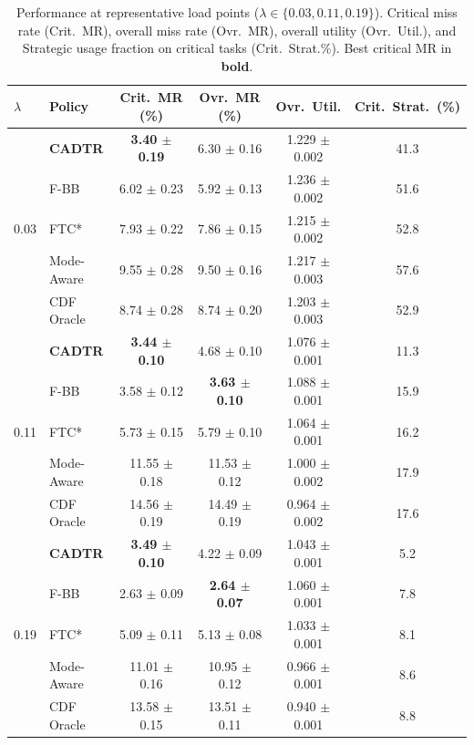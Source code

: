 \documentclass[fleqn,12pt,lineno]{wlpeerj}
\begin{document}
\begin{table}[t]
\centering
\caption{Performance at representative load points ($\lambda \in \{0.03, 0.11, 0.19\}$). Critical miss rate (Crit.\ MR), overall miss rate (Ovr.\ MR), overall utility (Ovr.\ Util.), and Strategic usage fraction on critical tasks (Crit.\ Strat.\%). Best critical MR in \textbf{bold}.}
\label{tab:lambda_sweep}
\begin{tabular}{l l c c c c}
\toprule
$\lambda$ & Policy & Crit.\ MR (\%) & Ovr.\ MR (\%) & Ovr.\ Util. & Crit.\ Strat.\ (\%) \\
\midrule
\multirow{5}{*}{0.03}
& \textbf{CADTR} & \textbf{3.40 $\pm$ 0.19} & 6.30 $\pm$ 0.16 & 1.229 $\pm$ 0.002 & 41.3 \\
& F-BB            & 6.02 $\pm$ 0.23          & 5.92 $\pm$ 0.13          & 1.236 $\pm$ 0.002          & 51.6 \\
& FTC*            & 7.93 $\pm$ 0.22          & 7.86 $\pm$ 0.15          & 1.215 $\pm$ 0.002          & 52.8 \\
& Mode-Aware      & 9.55 $\pm$ 0.28          & 9.50 $\pm$ 0.16          & 1.217 $\pm$ 0.003          & 57.6 \\
& CDF Oracle      & 8.74 $\pm$ 0.28          & 8.74 $\pm$ 0.20          & 1.203 $\pm$ 0.003          & 52.9 \\
\midrule
\multirow{5}{*}{0.11}
& \textbf{CADTR} & \textbf{3.44 $\pm$ 0.10} & 4.68 $\pm$ 0.10 & 1.076 $\pm$ 0.001 & 11.3 \\
& F-BB            & 3.58 $\pm$ 0.12          & \textbf{3.63 $\pm$ 0.10} & 1.088 $\pm$ 0.001          & 15.9 \\
& FTC*            & 5.73 $\pm$ 0.15          & 5.79 $\pm$ 0.10          & 1.064 $\pm$ 0.001          & 16.2 \\
& Mode-Aware      & 11.55 $\pm$ 0.18         & 11.53 $\pm$ 0.12         & 1.000 $\pm$ 0.002          & 17.9 \\
& CDF Oracle      & 14.56 $\pm$ 0.19         & 14.49 $\pm$ 0.19         & 0.964 $\pm$ 0.002          & 17.6 \\
\midrule
\multirow{5}{*}{0.19}
& \textbf{CADTR} & \textbf{3.49 $\pm$ 0.10} & 4.22 $\pm$ 0.09 & 1.043 $\pm$ 0.001 & 5.2 \\
& F-BB            & 2.63 $\pm$ 0.09          & \textbf{2.64 $\pm$ 0.07} & 1.060 $\pm$ 0.001          & 7.8 \\
& FTC*            & 5.09 $\pm$ 0.11          & 5.13 $\pm$ 0.08          & 1.033 $\pm$ 0.001          & 8.1 \\
& Mode-Aware      & 11.01 $\pm$ 0.16         & 10.95 $\pm$ 0.12         & 0.966 $\pm$ 0.001          & 8.6 \\
& CDF Oracle      & 13.58 $\pm$ 0.15         & 13.51 $\pm$ 0.11         & 0.940 $\pm$ 0.001          & 8.8 \\
\bottomrule
\end{tabular}
\end{table}
\end{document}
